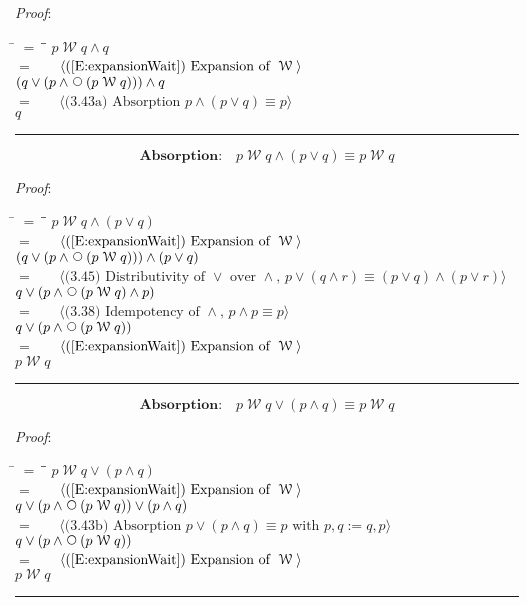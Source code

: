 \documentclass[12pt, fleqn, leqno]{article}
\newcommand{\lgap}{2pt}                             %
\newcommand{\mymathindent}{24pt}                    %
\newcommand{\Wait}{\;\mathcal{W}\;}
\newcommand{\Next}{\;\,\text{\raisebox{3.5pt}{\circle{6}}}}
\newcommand{\myqed}{\rule[-.23ex]{1.2ex}{2.0ex}}
\newcommand{\myqedtab}{\hspace{384pt}}              %
\newcommand{\Gll} {\langle}                         %
\newcommand{\Ggg} {\rangle}                         %
\newcommand{\Hint}[1]     {\ \ \ $\Gll              \mbox{#1} \Ggg$ }   %
\begin{document}
\emph{Proof}:
\begin{tabbing}
\hspace{\mymathindent} \= $= \;$ \= \myqedtab \= \kill
\> \> $p\Wait q\land q$\\[\lgap]
\> $=$ \> \Hint{(\ref{E:expansionWait}) Expansion of $\Wait$} \\[\lgap]
\> \> $(q\lor (p\land \Next (p\Wait q))) \land q$\\[\lgap]
\> $=$ \> \Hint{(3.43a) Absorption $p \land (p \lor q) \equiv p$} \\[\lgap]
\> \> $q$ \quad \myqed
\end{tabbing}
\begin{equation}\label{E:waitAndOr}
\textbf{Absorption:}\quad p\Wait q\land (p\lor q) \equiv p\Wait q
\end{equation}

\emph{Proof}:
\begin{tabbing}
\hspace{\mymathindent} \= $= \;$ \= \myqedtab \= \kill
\> \> $p\Wait q\land (p\lor q)$\\[\lgap]
\> $=$ \> \Hint{(\ref{E:expansionWait}) Expansion of $\Wait$} \\[\lgap]
\> \> $(q\lor (p\land \Next (p\Wait q))) \land (p\lor q)$\\[\lgap]
\> $=$ \> \Hint{(3.45) Distributivity of $\lor$ over $\land$, $p\lor (q\land r)\equiv (p\lor q)\land (p\lor r)$} \\[\lgap]
\> \> $q\lor (p\land \Next (p\Wait q) \land p)$\\[\lgap]
\> $=$ \> \Hint{(3.38) Idempotency of $\land$, $p \land p \equiv p$} \\[\lgap]
\> \> $q\lor (p\land \Next (p\Wait q))$\\[\lgap]
\> $=$ \> \Hint{(\ref{E:expansionWait}) Expansion of $\Wait$} \\[\lgap]
\> \> $p\Wait q$ \quad \myqed
\end{tabbing}
\begin{equation}\label{E:waitOrAnd}
\textbf{Absorption:}\quad p\Wait q\lor (p\land q) \equiv p\Wait q
\end{equation}

\emph{Proof}:
\begin{tabbing}
\hspace{\mymathindent} \= $= \;$ \= \myqedtab \= \kill
\> \> $p\Wait q\lor (p\land q)$\\[\lgap]
\> $=$ \> \Hint{(\ref{E:expansionWait}) Expansion of $\Wait$} \\[\lgap]
\> \> $q\lor (p\land \Next (p\Wait q)) \lor (p\land q)$\\[\lgap]
  \> $=$  \>  \Hint{(3.43b) Absorption $p \lor (p \land q) \equiv p$ with $p,q:=q,p$}\\[\lgap]
\> \> $q\lor (p\land \Next (p\Wait q))$\\[\lgap]
\> $=$ \> \Hint{(\ref{E:expansionWait}) Expansion of $\Wait$} \\[\lgap]
\> \> $p\Wait q$ \quad \myqed
\end{tabbing}
\end{document}
